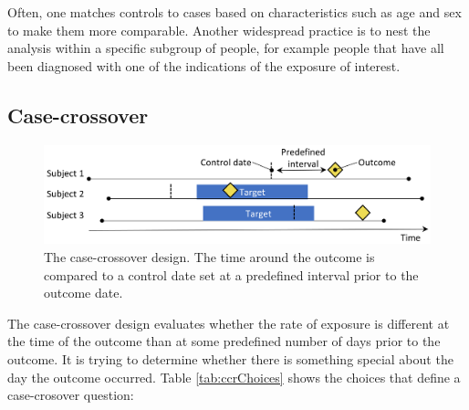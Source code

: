 \documentclass[]{book}
\begin{document}
Often, one matches controls to cases based on characteristics such as
age and sex to make them more comparable. Another widespread practice is
to nest the analysis within a specific subgroup of people, for example
people that have all been diagnosed with one of the indications of the
exposure of interest.

\subsection{Case-crossover}\label{case-crossover}

\begin{figure}

{\centering \includegraphics[width=0.9\linewidth]{images/PopulationLevelEstimation/caseCrossover} 

}

\caption{The case-crossover design. The time around the outcome is compared to a control date set at a predefined interval prior to the outcome date.}\label{fig:caseCrossover}
\end{figure}

The case-crossover \citep{maclure_1991} design evaluates whether the
rate of exposure is different at the time of the outcome than at some
predefined number of days prior to the outcome. It is trying to
determine whether there is something special about the day the outcome
occurred. Table \ref{tab:ccrChoices} shows the choices that define a
case-crosover question:
\end{document}

